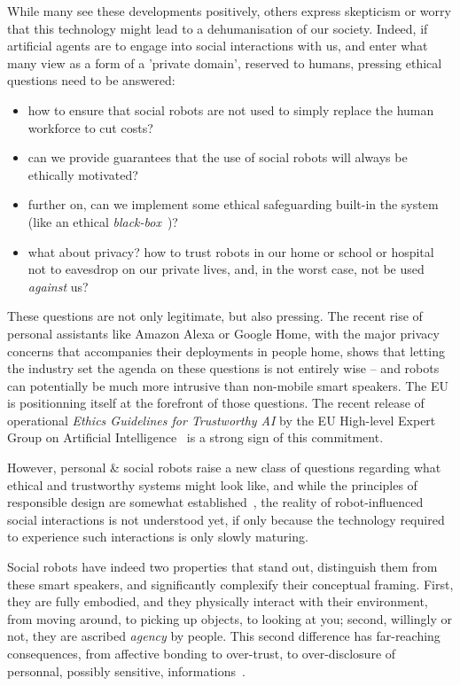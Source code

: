\documentclass[11pt]{report}
\begin{document}
While many see these developments positively,
others express skepticism or worry that this technology might lead to a
dehumanisation of our society. Indeed, if artificial agents are to engage into
social interactions with us, and enter what many view as a form of a 'private
domain', reserved to humans, pressing ethical questions need to be answered:

\begin{itemize}
    \item how to ensure that social robots are not used to simply replace the human
        workforce to cut costs?
    \item can we provide guarantees that the use of social robots will always be
        ethically motivated?
    \item further on, can we implement some ethical safeguarding built-in
        the system (like an ethical \emph{black-box}~\cite{winfield2017case})?
    \item what about privacy? how to trust robots in our home or school or
        hospital not to eavesdrop on our private lives, and, in the worst
        case, not be used \emph{against} us?
\end{itemize}

These questions are not only legitimate, but also pressing. The recent rise of
personal assistants like Amazon Alexa or Google Home, with the major privacy
concerns that accompanies their deployments in people home, shows that letting
the industry set the agenda on these questions is not entirely wise -- and
robots can potentially be much more intrusive than non-mobile smart speakers.
The EU is positionning itself at the forefront of those questions. The recent
release of operational \emph{Ethics Guidelines for Trustworthy AI} by the EU
High-level Expert Group on Artificial Intelligence~\cite{eu2019ethics} is a
strong sign of this commitment.

However, personal \& social robots raise a new class of questions regarding what
ethical and trustworthy systems might look like, and while the principles of
responsible design are somewhat established~\cite{stahl2016ethics,
bsi2016robots}, the reality of robot-influenced social interactions is not
understood yet, if only because the technology required to experience such
interactions is only slowly maturing. 

Social robots have indeed two properties that stand out, distinguish them from
these smart speakers, and significantly complexify their conceptual framing.
First, they are fully embodied, and they physically interact with their
environment, from moving around, to picking up objects, to looking at you;
second, willingly or not, they are ascribed \emph{agency} by people. This second
difference has far-reaching consequences, from affective bonding to over-trust,
to over-disclosure of personnal, possibly sensitive,
informations~\cite{martelaro2016tell,shiomi2017robot}.
\end{document}
